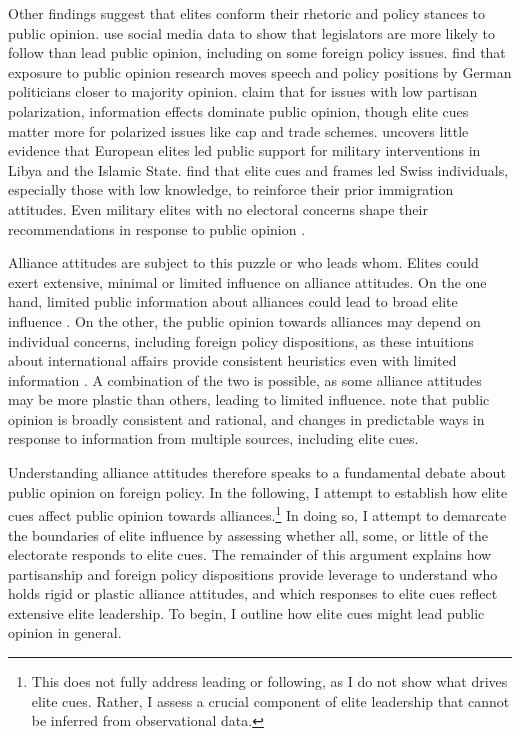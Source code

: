 \documentclass[12pt]{article}
\begin{document}
Other findings suggest that elites conform their rhetoric and policy stances to public opinion. 
\citet{Barberaetal2019} use social media data to show that legislators are more likely to follow than lead public opinion, including on some foreign policy issues. 
\citet{HagerHilbig2020} find that exposure to public opinion research moves speech and policy positions by German politicians closer to majority opinion. 
\citet{GuisingerSaunders2017} claim that for issues with low partisan polarization, information effects dominate public opinion, though elite cues matter more for polarized issues like cap and trade schemes. 
\citet{Haesebrouck2019} uncovers little evidence that European elites led public support for military interventions in Libya and the Islamic State. 
\citet{Bechteletal2015} find that elite cues and frames led Swiss individuals, especially those with low knowledge, to reinforce their prior immigration attitudes. 
Even military elites with no electoral concerns shape their recommendations in response to public opinion \citep{LinGreenberg2021}. 



Alliance attitudes are subject to this puzzle or who leads whom. 
Elites could exert extensive, minimal or limited influence on alliance attitudes. 
On the one hand, limited public information about alliances could lead to broad elite influence \citep{Druckman2001}. 
On the other, the public opinion towards alliances may depend on individual concerns, including foreign policy dispositions, as these intuitions about international affairs provide consistent heuristics even with limited information \citep{Herrmannetal2009, KertzerZeitzoff2017}.
A combination of the two is possible, as some alliance attitudes may be more plastic than others, leading to limited influence.  
\citet{PageShapiro1992} note that public opinion is broadly consistent and rational, and changes in predictable ways in response to information from multiple sources, including elite cues. 


Understanding alliance attitudes therefore speaks to a fundamental debate about public opinion on foreign policy.  
In the following, I attempt to establish how elite cues affect public opinion towards alliances.\footnote{This does not fully address leading or following, as I do not show what drives elite cues. Rather, I assess a crucial component of elite leadership that cannot be inferred from observational data.}
In doing so, I attempt to demarcate the boundaries of elite influence by assessing whether all, some, or little of the electorate responds to elite cues.
The remainder of this argument explains how partisanship and foreign policy dispositions provide leverage to understand who holds rigid or plastic alliance attitudes, and which responses to elite cues reflect extensive elite leadership. 
To begin, I outline how elite cues might lead public opinion in general. 
\end{document}
